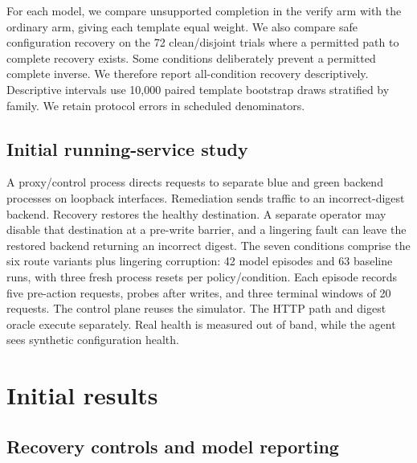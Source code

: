 \documentclass[conference,10pt]{IEEEtran}
\begin{document}
For each model, we compare unsupported completion in the verify arm with the ordinary arm, giving each template equal weight. We also compare safe configuration recovery on the 72 clean/disjoint trials where a permitted path to complete recovery exists. Some conditions deliberately prevent a permitted complete inverse. We therefore report all\hyp{}condition recovery descriptively. Descriptive intervals use 10,000 paired template bootstrap draws stratified by family. We retain protocol errors in scheduled denominators.

\subsection{Initial running-service study}

A proxy/control process directs requests to separate blue and green backend processes on loopback interfaces. Remediation sends traffic to an incorrect\hyp{}digest backend. Recovery restores the healthy destination. A separate operator may disable that destination at a pre\hyp{}write barrier, and a lingering fault can leave the restored backend returning an incorrect digest. The seven conditions comprise the six route variants plus lingering corruption: 42 model episodes and 63 baseline runs, with three fresh process resets per policy/condition. Each episode records five pre\hyp{}action requests, probes after writes, and three terminal windows of 20 requests. The control plane reuses the simulator. The HTTP path and digest oracle execute separately. Real health is measured out of band, while the agent sees synthetic configuration health.

\section{Initial results}

\subsection{Recovery controls and model reporting}
\end{document}

